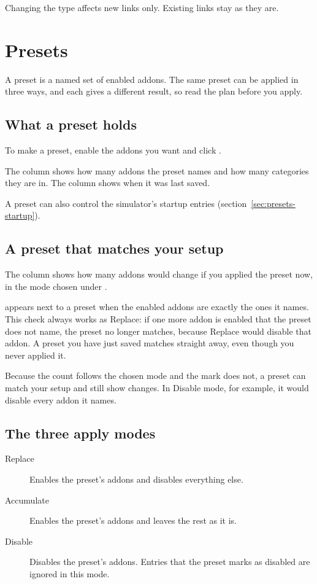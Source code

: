 \documentclass[11pt,a4paper]{article}
\begin{document}
Changing the type affects new links only. Existing links stay as they are.

\section{Presets}

A preset is a named set of enabled addons. The same preset can be applied in
three ways, and each gives a different result, so read the plan before you
apply.

\subsection{What a preset holds}

To make a preset, enable the addons you want and click .

The  column shows how many addons the preset names and how many
categories they are in. The  column shows when it was last saved.

A preset can also control the simulator's startup entries
(section~\ref{sec:presets-startup}).

\subsection{A preset that matches your setup}

The  column shows how many addons would change if you applied
the preset now, in the mode chosen under .

 appears next to a preset when the enabled addons are
exactly the ones it names. This check always works as Replace: if one more
addon is enabled that the preset does not name, the preset no longer matches,
because Replace would disable that addon. A preset you have just saved matches
straight away, even though you never applied it.

Because the count follows the chosen mode and the mark does not, a preset can
match your setup and still show changes. In Disable mode, for example, it would
disable every addon it names.

\subsection{The three apply modes}

\begin{description}
  \item[Replace] Enables the preset's addons and disables everything else.
  \item[Accumulate] Enables the preset's addons and leaves the rest as it is.
  \item[Disable] Disables the preset's addons. Entries that the preset marks as
    disabled are ignored in this mode.
\end{description}
\end{document}
